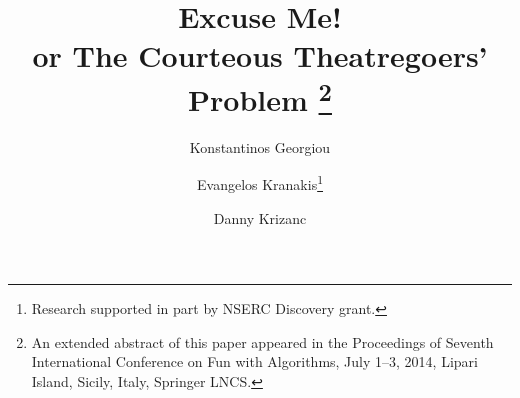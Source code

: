 \documentclass[11pt]{llncs}
\begin{document}
\title{Excuse Me! \\or The Courteous Theatregoers' Problem
\thanks{An extended abstract of this paper appeared in
the Proceedings of Seventh International Conference on
Fun with Algorithms,
July 1--3, 2014, Lipari Island, Sicily, Italy, Springer LNCS.}
}
\author{
Konstantinos Georgiou
\and
Evangelos Kranakis\thanks{Research supported in part by NSERC Discovery grant.}
\and
Danny Krizanc
}

\maketitle
\end{document}
